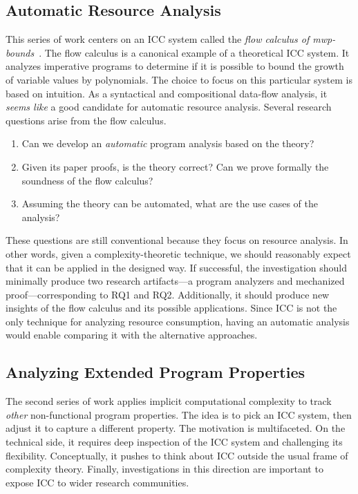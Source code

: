 \subsection{Automatic Resource Analysis}
\label{subsec:aicc-automatic-resource-analysis}

This series of work centers on an ICC system called the \emph{flow calculus of mwp-bounds}~\cite{jones2009}.
The flow calculus is a canonical example of a theoretical ICC system.
It analyzes imperative programs to determine if it is possible to bound the growth of variable values by polynomials.
The choice to focus on this particular system is based on intuition.
As a syntactical and compositional data-flow analysis, it \emph{seems like} a good candidate for automatic resource analysis.
Several research questions arise from the flow calculus.

\begin{enumerate}[label={(RQ\arabic*)}]
\item Can we develop an \emph{automatic} program analysis based on the theory?
\item Given its paper proofs, is the theory correct?
      Can we prove formally the soundness of the flow calculus?
\item Assuming the theory can be automated, what are the use cases of the analysis?
\end{enumerate}
These questions are still conventional because they focus on resource analysis.
In other words, given a complexity-theoretic technique, we should reasonably expect that it can be applied in the designed way.
If successful, the investigation should minimally produce two research artifacts---a program analyzers and mechanized proof---corresponding to RQ1 and RQ2.
Additionally, it should produce new insights of the flow calculus and its possible applications.
Since ICC is not the only technique for analyzing resource consumption,
having an automatic analysis would enable comparing it with the alternative approaches.

\subsection{Analyzing Extended Program Properties}
\label{subsec:extended-props}

The second series of work applies implicit computational complexity to track \emph{other} non-functional program properties.
The idea is to pick an ICC system, then adjust it to capture a different  property.
The motivation is multifaceted.
On the technical side, it requires deep inspection of the ICC system and challenging its flexibility.
Conceptually, it pushes to think about ICC outside the usual frame of complexity theory.
Finally, investigations in this direction are important to expose ICC to wider research communities.

